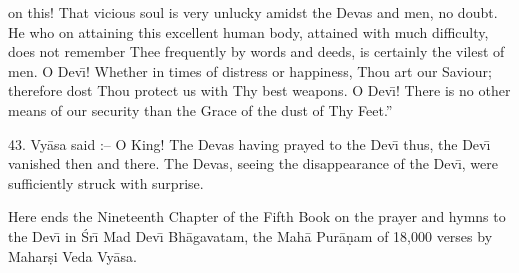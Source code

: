 on this! That vicious soul is very unlucky amidst the Devas and men, no doubt. He who on attaining this excellent human body, attained with much difficulty, does not remember Thee frequently by words and deeds, is certainly the vilest of men. O Dev\={\i}! Whether in times of distress or happiness, Thou art our Saviour; therefore dost Thou protect us with Thy best weapons. O Dev\={\i}! There is no other means of our security than the Grace of the dust of Thy Feet.''

43. Vy\=asa said :-- O King! The Devas having prayed to the Dev\={\i} thus, the Dev\={\i} vanished then and there. The Devas, seeing the disappearance of the Dev\={\i}, were sufficiently struck with surprise.

Here ends the Nineteenth Chapter of the Fifth Book on the prayer and hymns to the Dev\={\i} in \'Sr\={\i} Mad Dev\={\i} Bh\=agavatam, the Mah\=a Pur\=a\d{n}am of 18,000 verses by Mahar\d{s}i Veda Vy\=asa.




